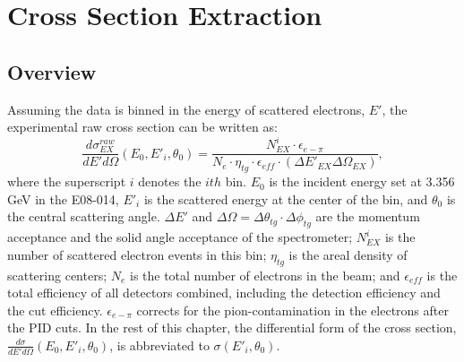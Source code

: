 \chapter{Cross Section Extraction}

\section{Overview}
 Assuming the data is binned in the energy of scattered electrons, $E'$, the experimental raw cross section can be written as:
\begin{equation}
  \frac{d\sigma^{raw}_{EX}}{dE'd\Omega} (E_{0},E'_{i}, \theta_{0}) = \frac{N^{i}_{EX}\cdot \epsilon_{e-\pi}}{N_{e} \cdot \eta_{tg} \cdot \epsilon_{eff}\cdot (\Delta E'_{EX}\Delta\Omega_{EX})},
  \label{eqxs_org}
\end{equation}
where the superscript $i$ denotes the $ith$ bin. $E_{0}$ is the incident energy set at 3.356 GeV in the E08-014, $E'_{i}$ is the scattered energy at the center of the bin, and $\theta_{0}$ is the central scattering angle. $\Delta E'$ and $\Delta\Omega=\Delta\theta_{tg}\cdot \Delta\phi_{tg}$ are the momentum acceptance and the solid angle acceptance of the spectrometer; $N^{i}_{EX}$ is the number of scattered electron events in this bin; $\eta_{tg}$ is the areal density of scattering centers; $N_{e}$ is the total number of electrons in the beam; and $\epsilon_{eff}$ is the total efficiency of all detectors combined, including the detection efficiency and the cut efficiency. $\epsilon_{e-\pi}$ corrects for the pion-contamination in the electrons after the PID cuts. In the rest of this chapter, the differential form of the cross section, $\frac{d\sigma}{dE'd\Omega}(E_{0},E'_{i}, \theta_{0})$, is abbreviated to $\sigma(E'_{i}, \theta_{0})$.

